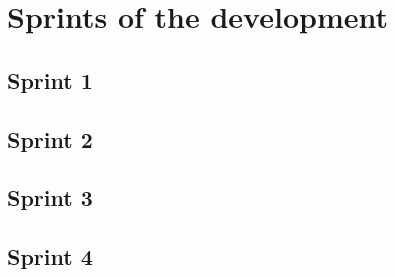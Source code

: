 \chapter{Sprints of the development}\label{CAP:PrintsOfTheDevelopment}
\section{Sprint 1}\label{SEC:Sprint1}

\section{Sprint 2}\label{SEC:Sprint2}
\section{Sprint 3}\label{SEC:Sprint3}
\section{Sprint 4}\label{SEC:Sprint4}